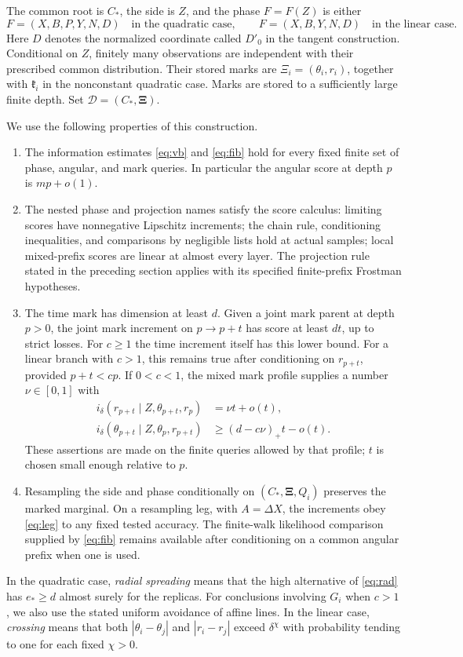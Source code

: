 \begin{definition}\label{int:data}
The common root is $C_*$, the side is $Z$, and the phase $F=F(Z)$ is either
\[
 F=(X,B,P,Y,N,D)\quad\text{in the quadratic case},\qquad
 F=(X,B,Y,N,D)\quad\text{in the linear case}.
\]
Here $D$ denotes the normalized coordinate called $D'_0$ in the tangent
construction. Conditional on $Z$, finitely many observations are
independent with their prescribed common distribution. Their stored
marks are $\Xi_i=(\theta_i,r_i)$, together with $\mathfrak k_i$ in the
nonconstant quadratic case. Marks are stored to a sufficiently large
finite depth. Set $\mathcal D=(C_*,\boldsymbol\Xi)$.

We use the following properties of this construction.
\begin{enumerate}[label=(\roman*)]
\item The information estimates \eqref{eq:vb} and \eqref{eq:fib} hold
for every fixed finite set of phase, angular, and mark queries. In
particular the angular score at depth $p$ is $mp+o(1)$.
\item The nested phase and projection names satisfy the score calculus:
limiting scores have nonnegative Lipschitz increments; the chain rule,
conditioning inequalities, and comparisons by negligible lists hold
at actual samples; local mixed-prefix scores are linear at almost
every layer. The projection rule stated in the preceding section
applies with its specified finite-prefix Frostman hypotheses.
\item The time mark has dimension at least $d$. Given a joint mark
parent at depth $p>0$, the joint mark increment on $p\to p+t$ has
score at least $dt$, up to strict losses. For $c\geq1$ the time
increment itself has this lower bound. For a linear branch with
$c>1$, this remains true after conditioning on $r_{p+t}$, provided
$p+t<cp$. If $0<c<1$, the mixed mark profile supplies a number
$\nu\in[0,1]$ with
\[
 \begin{split}
 i_\delta(r_{p+t}\mid Z,\theta_{p+t},r_p)&=\nu t+o(t),\\
 i_\delta(\theta_{p+t}\mid Z,\theta_p,r_{p+t})
   &\geq (d-c\nu)_+t-o(t).
 \end{split}
\]
These assertions are made on the finite queries allowed by that
profile; $t$ is chosen small enough relative to $p$.
\item Resampling the side and phase conditionally on
$(C_*,\boldsymbol\Xi,Q_i)$ preserves the marked marginal. On a
resampling leg, with $A=\Delta X$, the increments obey
\eqref{eq:leg} to any fixed tested accuracy. The finite-walk
likelihood comparison supplied by \eqref{eq:fib} remains available
after conditioning on a common angular prefix when one is used.
\end{enumerate}
In the quadratic case, \emph{radial spreading} means that the
high alternative of \eqref{eq:rad} has $e_*\geq d$ almost surely for
the replicas. For conclusions involving $G_i$ when $c>1$, we also use
the stated uniform avoidance of affine lines. In the linear case,
\emph{crossing} means that both $|\theta_i-\theta_j|$ and
$|r_i-r_j|$ exceed $\delta^\chi$ with probability tending to one for
each fixed $\chi>0$.
\end{definition}

